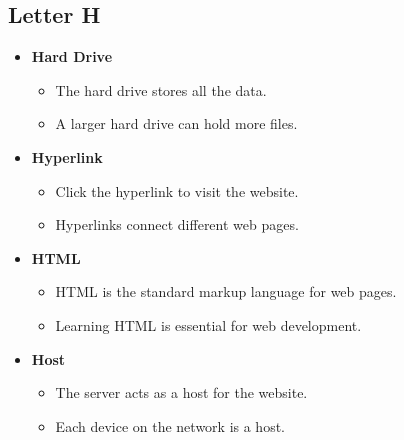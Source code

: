 \subsection{Letter H}
\begin{itemize}
    \item \textbf{Hard Drive}
    \begin{itemize}
        \item The hard drive stores all the data.
        \item A larger hard drive can hold more files.
    \end{itemize}
    \item \textbf{Hyperlink}
    \begin{itemize}
        \item Click the hyperlink to visit the website.
        \item Hyperlinks connect different web pages.
    \end{itemize}
    \item \textbf{HTML}
    \begin{itemize}
        \item HTML is the standard markup language for web pages.
        \item Learning HTML is essential for web development.
    \end{itemize}
    \item \textbf{Host}
    \begin{itemize}
        \item The server acts as a host for the website.
        \item Each device on the network is a host.
    \end{itemize}
\end{itemize}

